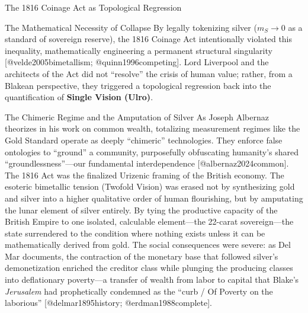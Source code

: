 \documentclass[
  ignorenonframetext,
]{beamer}
\begin{document}
\begin{frame}{The 1816 Coinage Act as Topological Regression}
\begin{block}{The Mathematical Necessity of Collapse}
By legally tokenizing silver (\(m_S \to 0\) as a standard of sovereign
reserve), the 1816 Coinage Act intentionally violated this inequality,
mathematically engineering a permanent structural singularity
{[}@velde2005bimetallism; @quinn1996competing{]}. Lord Liverpool and the
architects of the Act did not ``resolve'' the crisis of human value;
rather, from a Blakean perspective, they triggered a topological
regression back into the quantification of \textbf{Single Vision
(Ulro)}.
\end{block}

\begin{block}{The Chimeric Regime and the Amputation of Silver}
\protect{}\label{the-chimeric-regime-and-the-amputation-of-silver}
As Joseph Albernaz theorizes in his work on common wealth, totalizing
measurement regimes like the Gold Standard operate as deeply
``chimeric'' technologies. They enforce false ontologies to ``ground'' a
community, purposefully obfuscating humanity's shared
``groundlessness''---our fundamental interdependence
{[}@albernaz2024common{]}. The 1816 Act was the finalized Urizenic
framing of the British economy. The esoteric bimetallic tension (Twofold
Vision) was erased not by synthesizing gold and silver into a higher
qualitative order of human flourishing, but by amputating the lunar
element of silver entirely. By tying the productive capacity of the
British Empire to one isolated, calculable element---the 22-carat
sovereign---the state surrendered to the condition where nothing exists
unless it can be mathematically derived from gold. The social
consequences were severe: as Del Mar documents, the contraction of the
monetary base that followed silver's demonetization enriched the
creditor class while plunging the producing classes into deflationary
poverty---a transfer of wealth from labor to capital that Blake's
\emph{Jerusalem} had prophetically condemned as the ``curb / Of Poverty
on the laborious'' {[}@delmar1895history; @erdman1988complete{]}.


\end{block}
\end{frame}
\end{document}
